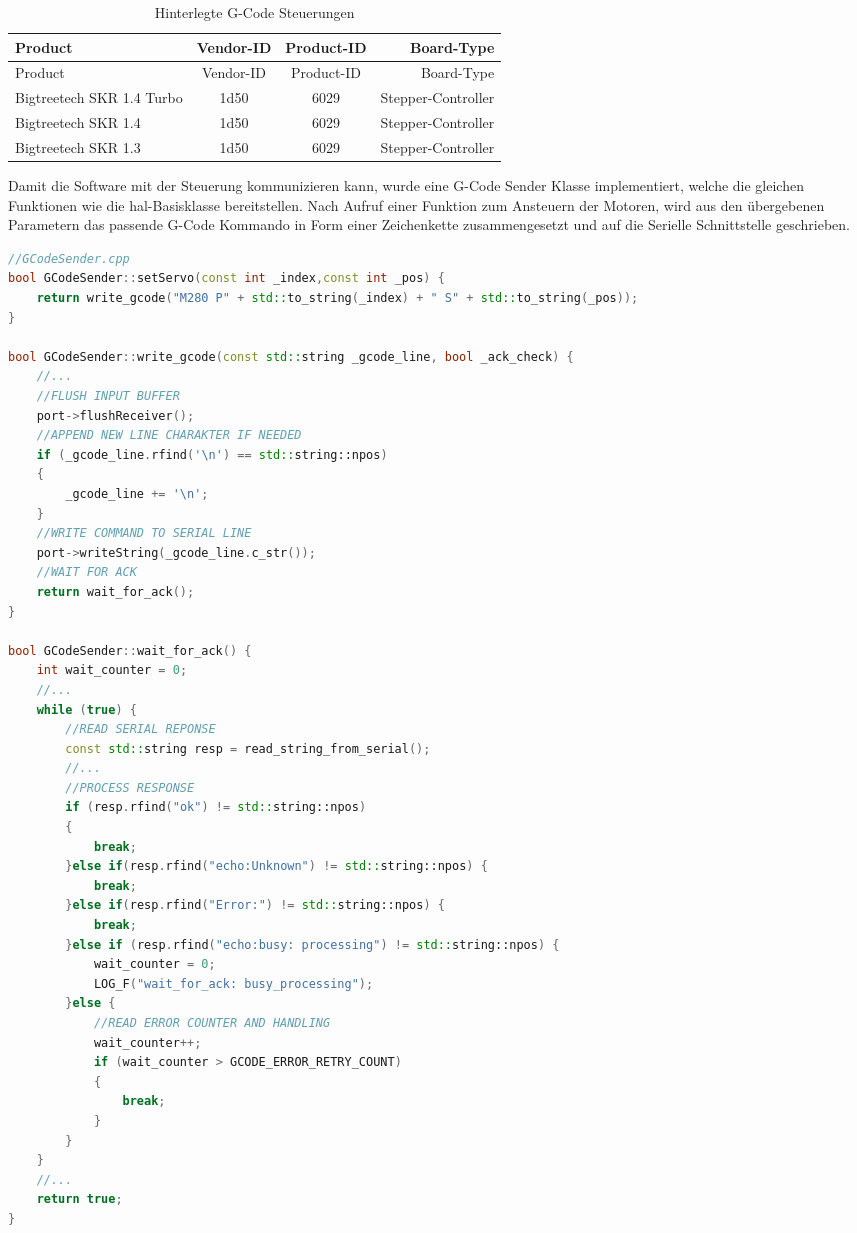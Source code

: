 \begin{longtable}[]{@{}lccr@{}}
\caption{Hinterlegte G-Code Steuerungen
\label{gcodeusbctl}}\tabularnewline
\toprule
Product & Vendor-ID & Product-ID & Board-Type\tabularnewline
\midrule
\endfirsthead
\toprule
Product & Vendor-ID & Product-ID & Board-Type\tabularnewline
\midrule
\endhead
Bigtreetech SKR 1.4 Turbo & 1d50 & 6029 &
Stepper-Controller\tabularnewline
Bigtreetech SKR 1.4 & 1d50 & 6029 & Stepper-Controller\tabularnewline
Bigtreetech SKR 1.3 & 1d50 & 6029 & Stepper-Controller\tabularnewline
\bottomrule
\end{longtable}

Damit die Software mit der Steuerung kommunizieren kann, wurde eine
G-Code Sender Klasse implementiert, welche die gleichen Funktionen wie
die \gls{hal}-Basisklasse bereitstellen. Nach Aufruf einer Funktion zum
Ansteuern der Motoren, wird aus den übergebenen Parametern das passende
G-Code Kommando in Form einer Zeichenkette zusammengesetzt und auf die
Serielle Schnittstelle geschrieben.

\begin{lstlisting}[language={C++}]
//GCodeSender.cpp
bool GCodeSender::setServo(const int _index,const int _pos) {
    return write_gcode("M280 P" + std::to_string(_index) + " S" + std::to_string(_pos));
}

bool GCodeSender::write_gcode(const std::string _gcode_line, bool _ack_check) {
    //...
    //FLUSH INPUT BUFFER
    port->flushReceiver();
    //APPEND NEW LINE CHARAKTER IF NEEDED
    if (_gcode_line.rfind('\n') == std::string::npos)
    {
        _gcode_line += '\n';
    }
    //WRITE COMMAND TO SERIAL LINE
    port->writeString(_gcode_line.c_str());
    //WAIT FOR ACK
    return wait_for_ack();
}

bool GCodeSender::wait_for_ack() {
    int wait_counter = 0;
    //...
    while (true) {
        //READ SERIAL REPONSE
        const std::string resp = read_string_from_serial();
        //...
        //PROCESS RESPONSE
        if (resp.rfind("ok") != std::string::npos)
        {
            break;
        }else if(resp.rfind("echo:Unknown") != std::string::npos) {
            break;
        }else if(resp.rfind("Error:") != std::string::npos) {
            break;            
        }else if (resp.rfind("echo:busy: processing") != std::string::npos) {
            wait_counter = 0;
            LOG_F("wait_for_ack: busy_processing");
        }else {
            //READ ERROR COUNTER AND HANDLING
            wait_counter++;
            if (wait_counter > GCODE_ERROR_RETRY_COUNT)
            {
                break;
            }
        }
    }
    //...
    return true;
}
\end{lstlisting}


